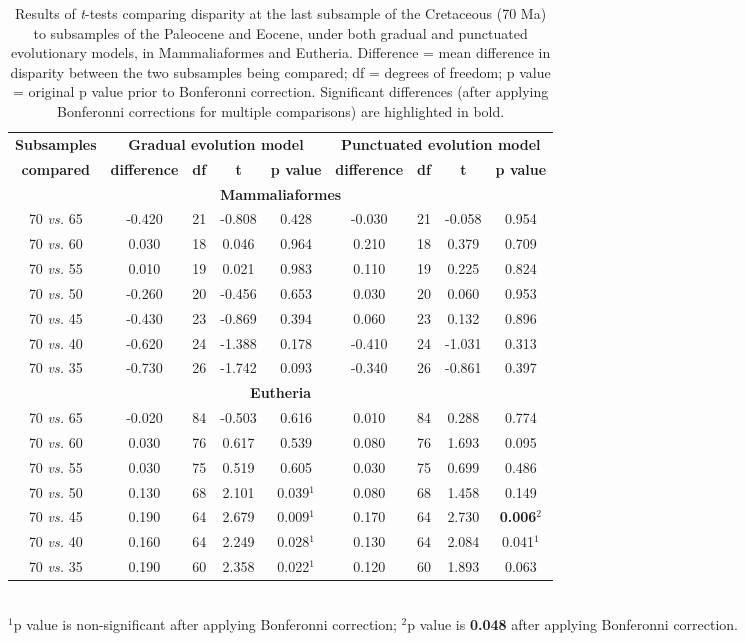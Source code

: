 \documentclass[12pt,letterpaper]{article}
\begin{document}
\begin{table}[ht]
\caption{\scriptsize{Results of \textit{t}-tests comparing disparity at the last subsample of the Cretaceous (70 Ma) to subsamples of the Paleocene and Eocene, under both gradual and punctuated evolutionary models, in Mammaliaformes and Eutheria. Difference = mean difference in disparity between the two subsamples being compared; df = degrees of freedom; p value = original p value prior to Bonferonni correction. Significant differences (after applying Bonferonni corrections for multiple comparisons) are highlighted in bold.}}
\label{tab:Tab_results}
\centering
\begin{tabular}{c|cccc|cccc}
  \hline
  \textbf{Subsamples} & \multicolumn{4}{c|}{\textbf{Gradual evolution model}} & \multicolumn{4}{c}{\textbf{Punctuated evolution model}} \\
  \textbf{compared} & \textbf{difference} & \textbf{df} & \textbf{t} & \textbf{p value} & \textbf{difference} & \textbf{df} & \textbf{t} & \textbf{p value} \\ 
  \hline
  \multicolumn{9}{c}{\textbf{Mammaliaformes}}\\
  \hline
  70 \textit{vs.} 65 & -0.420 & 21 & -0.808 & 0.428 & -0.030 & 21 & -0.058 & 0.954 \\ 
  70 \textit{vs.} 60 & 0.030 & 18 & 0.046 & 0.964 & 0.210 & 18 & 0.379 & 0.709 \\ 
  70 \textit{vs.} 55 & 0.010 & 19 & 0.021 & 0.983 & 0.110 & 19 & 0.225 & 0.824 \\ 
  70 \textit{vs.} 50 & -0.260 & 20 & -0.456 & 0.653 & 0.030 & 20 & 0.060 & 0.953 \\ 
  70 \textit{vs.} 45 & -0.430 & 23 & -0.869 & 0.394 & 0.060 & 23 & 0.132 & 0.896 \\ 
  70 \textit{vs.} 40 & -0.620 & 24 & -1.388 & 0.178 & -0.410 & 24 & -1.031 & 0.313 \\ 
  70 \textit{vs.} 35 & -0.730 & 26 & -1.742 & 0.093 & -0.340 & 26 & -0.861 & 0.397 \\ 
  \hline
  \multicolumn{9}{c}{\textbf{Eutheria}}\\
  \hline
  70 \textit{vs.} 65 & -0.020 & 84 & -0.503 & 0.616 & 0.010 & 84 & 0.288 & 0.774 \\ 
  70 \textit{vs.} 60 & 0.030 & 76 & 0.617 & 0.539 & 0.080 & 76 & 1.693 & 0.095 \\ 
  70 \textit{vs.} 55 & 0.030 & 75 & 0.519 & 0.605 & 0.030 & 75 & 0.699 & 0.486 \\ 
  70 \textit{vs.} 50 & 0.130 & 68 & 2.101 & 0.039$^1$ & 0.080 & 68 & 1.458 & 0.149 \\ 
  70 \textit{vs.} 45 & 0.190 & 64 & 2.679 & 0.009$^1$ & 0.170 & 64 & 2.730 & \textbf{0.006}$^2$ \\ 
  70 \textit{vs.} 40 & 0.160 & 64 & 2.249 & 0.028$^1$ & 0.130 & 64 & 2.084 & 0.041$^1$ \\ 
  70 \textit{vs.} 35 & 0.190 & 60 & 2.358 & 0.022$^1$ & 0.120 & 60 & 1.893 & 0.063 \\ 
   \hline
\end{tabular} \\
   \small{$^1$p value is non-significant after applying Bonferonni correction;
   $^2$p value is \textbf{0.048} after applying Bonferonni correction.}
\end{table}
\end{document}
